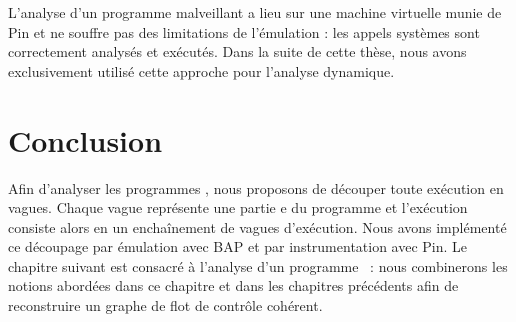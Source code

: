 L'analyse d'un programme malveillant a lieu sur une machine virtuelle munie de Pin et ne souffre pas des limitations de l'émulation : les appels systèmes sont correctement analysés et exécutés. 
Dans la suite de cette thèse, nous avons exclusivement utilisé cette approche pour l'analyse dynamique.

\section*{Conclusion}
Afin d'analyser les programmes \sms, nous proposons de découper toute exécution en vagues. Chaque vague représente une partie \nsm e du programme et l'exécution consiste alors en un enchaînement de vagues d'exécution.
Nous avons implémenté ce découpage par émulation avec BAP et par instrumentation avec Pin.
Le chapitre suivant est consacré à l'analyse d'un programme \sm\ : nous combinerons les notions abordées dans ce chapitre et dans les chapitres précédents afin de reconstruire un graphe de flot de contrôle cohérent.
